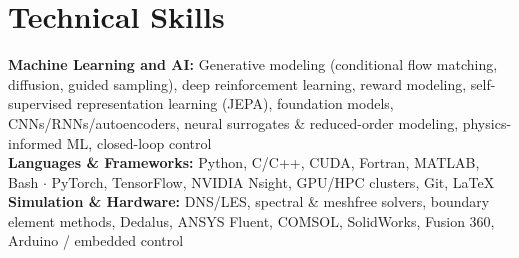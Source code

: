 \documentclass[letterpaper,10pt]{article}
\begin{document}
\section{Technical Skills}
\vspace{3pt}
\small
\textbf{\color{accent}Machine Learning and AI:} Generative modeling (conditional flow matching, diffusion, guided sampling), deep reinforcement learning, reward modeling, self-supervised representation learning (JEPA), foundation models, CNNs/RNNs/autoencoders, neural surrogates \& reduced-order modeling, physics-informed ML, closed-loop control \\
\textbf{\color{accent}Languages \& Frameworks:} Python, C/C++, CUDA, Fortran, MATLAB, Bash $\cdot$ PyTorch, TensorFlow, NVIDIA Nsight, GPU/HPC clusters, Git, \LaTeX \\
\textbf{\color{accent}Simulation \& Hardware:} DNS/LES, spectral \& meshfree solvers, boundary element methods, Dedalus, ANSYS Fluent, COMSOL, SolidWorks, Fusion 360, Arduino / embedded control
\vspace{2pt}
\end{document}
